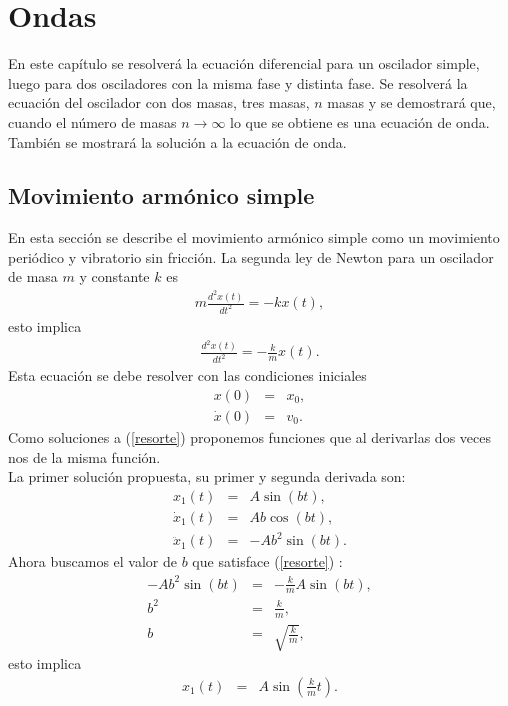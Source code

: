 \documentclass[letterpaper,12pt,oneside]{book}
\begin{document}
\chapter{Ondas}
En este cap\'itulo se resolver\'a la ecuaci\'on diferencial para un oscilador simple, luego para dos osciladores con la misma fase y distinta fase. Se resolver\'a la ecuaci\'on del oscilador con dos masas, tres masas, $n$ masas y se demostrar\'a que, cuando el n\'umero de masas $n \to \infty$ lo que se obtiene es una ecuaci\'on de onda. Tambi\'en se mostrar\'a la soluci\'on a la ecuaci\'on de onda.
\section{Movimiento arm\'onico simple}
En esta secci\'on se describe el movimiento arm\'onico simple como un movimiento peri\'odico y vibratorio sin fricci\'on. 
%
La segunda ley de Newton para un oscilador de masa $m$ y constante $k$ es 
% 
\begin{eqnarray}
m\frac{d^2x(t)}{dt^2}=-kx(t)\label{resorte},
\end{eqnarray}
%
esto implica
\begin{eqnarray}
\frac{d^2x(t)}{dt^2} = -\frac{k}{m}x(t).\nonumber
\end{eqnarray}
%
Esta ecuaci\'on se debe resolver con las condiciones iniciales 
%
\begin{eqnarray}
x(0)&=&x_0\label{cond1},\\
\dot x(0) &=& v_0\label{cond2}.
\end{eqnarray}
Como soluciones a (\ref{resorte}) proponemos funciones que al derivarlas dos veces nos de la misma funci\'on.\\ 
La primer soluci\'on propuesta, su primer y segunda derivada son:
% 
\begin{eqnarray}
x_1(t)&=&A\sin(bt),\label{x_1} \\
\dot x_1(t)&=&Ab\cos(bt),\nonumber \\
\ddot x_1(t)&=&-Ab^2\sin(bt).\nonumber
\end{eqnarray}
%
Ahora buscamos el valor de $b$ que satisface (\ref{resorte}) :
% 
\begin{eqnarray}
-Ab^2\sin(bt) &=&  -\frac{k}{m}A\sin(bt),\nonumber \\
b^2 &=& \frac{k}{m},\nonumber \\
b&=&\sqrt{\frac{k}{m}},\nonumber
\end{eqnarray}
%
esto implica
\begin{eqnarray}
x_1(t) &=& A\sin\left(\frac{k}{m}t\right)\nonumber.
\end{eqnarray}
\end{document}
